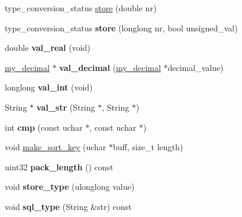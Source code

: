 \begin{DoxyCompactItemize}
\item 
type\+\_\+conversion\+\_\+status \mbox{\hyperlink{classField__enum_a82c1cdf5b47cd0266d9974e834695523}{store}} (double nr)
\item 
\mbox{\label{classField__enum_a0992f5529252d0215ca48704b3caa6b8}} 
type\+\_\+conversion\+\_\+status {\bfseries store} (longlong nr, bool unsigned\+\_\+val)
\item 
\mbox{\label{classField__enum_a805cde674cbdab8ca49302b27a7d87cf}} 
double {\bfseries val\+\_\+real} (void)
\item 
\mbox{\label{classField__enum_a3249e878d82d2d16bc17994c458e22a7}} 
\mbox{\hyperlink{classmy__decimal}{my\+\_\+decimal}} $\ast$ {\bfseries val\+\_\+decimal} (\mbox{\hyperlink{classmy__decimal}{my\+\_\+decimal}} $\ast$decimal\+\_\+value)
\item 
\mbox{\label{classField__enum_a0130645ef8769de45e36ec025bf95d3f}} 
longlong {\bfseries val\+\_\+int} (void)
\item 
\mbox{\label{classField__enum_a386fa252955a0580283caa4893b4b98e}} 
String $\ast$ {\bfseries val\+\_\+str} (String $\ast$, String $\ast$)
\item 
\mbox{\label{classField__enum_a6bfa4098291b74fc7fd5e418064f1492}} 
int {\bfseries cmp} (const uchar $\ast$, const uchar $\ast$)
\item 
void \mbox{\hyperlink{classField__enum_af029bb9f549b5ee362fbf84c8540b24a}{make\+\_\+sort\+\_\+key}} (uchar $\ast$buff, size\+\_\+t length)
\item 
\mbox{\label{classField__enum_a23a993d691dae601b6ee183e1caeea32}} 
uint32 {\bfseries pack\+\_\+length} () const
\item 
\mbox{\label{classField__enum_ab651a6187704906840d8af73648f094b}} 
void {\bfseries store\+\_\+type} (ulonglong value)
\item 
\mbox{\label{classField__enum_a5b8469d6f6fa7bdf170ed64905660758}} 
void {\bfseries sql\+\_\+type} (String \&str) const
\item 

\end{DoxyCompactItemize}
